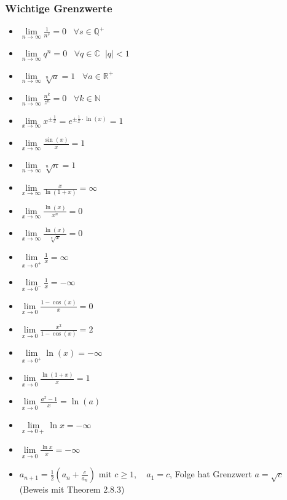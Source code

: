 \documentclass[a3paper, 11pt, landscape]{scrartcl}
\begin{document}
\begin{multicols*}{3}
		\subsubsection{Wichtige Grenzwerte}
		\begin{itemize}
		    \item $\lim\limits_{n\rightarrow \infty} \frac{1}{n^s}=0\hspace{10pt} \forall s\in \mathbb{Q^+}$
		    \item $\lim\limits_{n\rightarrow \infty} q^n=0 \hspace{10pt} \forall q\in \mathbb{C}\hspace{7pt} \vert q\vert <1$
		    \item $\lim\limits_{n\rightarrow \infty} \sqrt[n]{a}=1 \hspace{10pt} \forall a\in \mathbb{R^+}$
		    \item $\lim\limits_{n\rightarrow \infty} \frac{n^k}{z^n}=0 \hspace{10pt} \forall k \in \mathbb{N}$
		    \item $\lim\limits_{x\rightarrow\infty} x^{\pm\frac{1}{x}}=e^{\pm\frac{1}{x}\cdot\ln(x)}=1$
		    \item $\lim\limits_{x\rightarrow\infty} \frac{\sin (x)}{x}=1$
		    \item $\lim\limits_{n\rightarrow \infty} \sqrt[n]{n}=1$
		    \item $\lim\limits_{x \rightarrow \infty}\frac{x}{\ln(1+x)}=\infty$
		    \item $\lim\limits_{x \rightarrow \infty}\frac{\ln(x)}{x^n}=0$
		    \item $\lim\limits_{x \rightarrow \infty}\frac{\ln(x)}{\sqrt[n]{x}}=0 $
		    \item $\lim\limits_{x \rightarrow 0^+}\frac{1}{x}=\infty$
		    \item $\lim\limits_{x \rightarrow 0^-}\frac{1}{x}=-\infty$
		    \item $\lim\limits_{x \rightarrow 0}\frac{1-\cos(x)}{x}=0$
		    \item $\lim\limits_{x \rightarrow 0}\frac{x^2}{1-\cos(x)}=2$
		    \item $\lim\limits_{x \rightarrow 0^+}\ln(x)=-\infty$
		    \item $\lim\limits_{x \rightarrow 0}\frac{\ln(1+x)}{x}=1$
		    \item $\lim\limits_{x \rightarrow 0}\frac{a^x-1}{x}=\ln(a)$
		    \item $\lim\limits_{x\to 0+}\ln x = -\infty$
		    \item $\lim\limits_{x\to 0} \frac{\ln x}{x}=-\infty$
		    \item $a_{n+1} = \frac{1}{2}(a_n + \frac{c}{a_n})$ mit $c\geq 1, \quad a_1 = c$, Folge hat Grenzwert $a=\sqrt{c}$ (Beweis mit Theorem 2.8.3)
		\end{itemize}

\end{multicols*}
\end{document}
